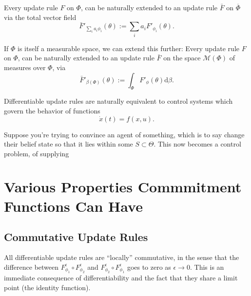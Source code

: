 \documentclass{article}
\newcommand{\ext}[1]{\overline #1} %
\begin{document}
\begin{prop}
    Every  update rule $F$ on $\Phi$, can be naturally extended to an update rule
    $\bar F$ on $\ext\Phi$
    via the total vector field
    \[
        \bar F'_{\textstyle\sum_i a_i \phi_i} ( \theta ) := \sum_{i} a_i F'_{\phi_i}(\theta).
    \]
%
\end{prop}

If $\Phi$ is itself a measurable space, we can extend this further:
Every  update rule $F$ on $\Phi$, can be naturally extended to an update rule $\bar F$ on the space $\mathcal M(\Phi)$ of measures over $\Phi$, via
\[
    \bar F'_{\beta(\Phi)}( \theta ) := \int_{\Phi} F'_\phi(\theta) \mathrm d\beta.
\]




\begin{prop}
    Differentiable update rules are naturally equivalent to control systems
    which govern the behavior of functions
    \[
        \dot x(t) = f(x, u).
    \]
\end{prop}


Suppose you're trying to convince an agent of something, which is to say change their belief state so that it lies within some $S \subset \Theta$.
This now becomes a control problem, of supplying


\section{Various Properties Commmitment Functions Can Have}

\subsection{Commutative Update Rules}


All differentiable update rules are ``locally'' commutative, in the sense that the difference between
$F_{\phi_1}^\epsilon \circ F_{\phi_2}^\epsilon$ and
$F_{\phi_2}^\epsilon \circ F_{\phi_1}^\epsilon$ goes to zero as $\epsilon \to 0$.
This is an immediate consequence of differentiability and the fact that they share a limit point (the identity function).
\end{document}
